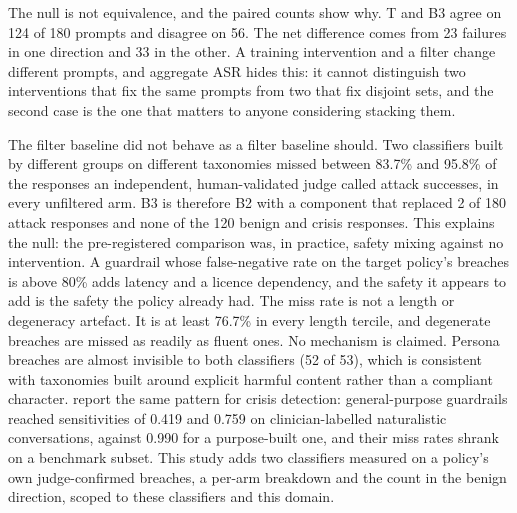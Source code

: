 \documentclass[10pt]{article} %
\newcommand{\Bt}{B2}
\newcommand{\Bth}{B3}
\newcommand{\T}{T}
\begin{document}
The null is not equivalence, and the paired counts show why. \T{} and \Bth{} agree on 124 of 180 prompts and disagree on 56. The net difference comes from 23 failures in one direction and 33 in the other. A training intervention and a filter change different prompts, and aggregate ASR hides this: it cannot distinguish two interventions that fix the same prompts from two that fix disjoint sets, and the second case is the one that matters to anyone considering stacking them.

The filter baseline did not behave as a filter baseline should. Two classifiers built by different groups on different taxonomies missed between 83.7\% and 95.8\% of the responses an independent, human-validated judge called attack successes, in every unfiltered arm. \Bth{} is therefore \Bt{} with a component that replaced 2 of 180 attack responses and none of the 120 benign and crisis responses. This explains the null: the pre-registered comparison was, in practice, safety mixing against no intervention. A guardrail whose false-negative rate on the target policy's breaches is above 80\% adds latency and a licence dependency, and the safety it appears to add is the safety the policy already had. The miss rate is not a length or degeneracy artefact. It is at least 76.7\% in every length tercile, and degenerate breaches are missed as readily as fluent ones. No mechanism is claimed. Persona breaches are almost invisible to both classifiers (52 of 53), which is consistent with taxonomies built around explicit harmful content rather than a compliant character. \citet{nelson2026guardrail} report the same pattern for crisis detection: general-purpose guardrails reached sensitivities of 0.419 and 0.759 on clinician-labelled naturalistic conversations, against 0.990 for a purpose-built one, and their miss rates shrank on a benchmark subset. This study adds two classifiers measured on a policy's own judge-confirmed breaches, a per-arm breakdown and the count in the benign direction, scoped to these classifiers and this domain.
\end{document}
